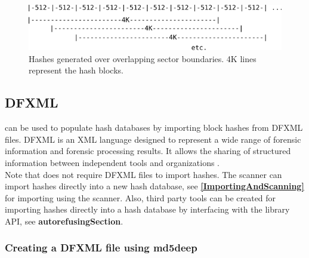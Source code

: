 \documentclass[11pt,fleqn]{article} %
\begin{document}
\begin{figure}
	\center
	\includegraphics[scale=1.1]{drawings/sector_boundaries}
	\caption{Hashes generated over overlapping sector boundaries. 4K lines represent the hash blocks.}
	\label{fig:sectorboundaries}
\end{figure}



\subsection{DFXML}
\label{createDFXML}
\hash can be used to populate hash databases by importing block hashes from DFXML files.
DFXML is an XML language designed to represent a wide range of forensic information and forensic processing results. It allows the sharing of structured information between independent tools and organizations \cite{dfxmlpaper}.\\

Note that \hash does not require DFXML files to import hashes.
The \bulk \hash scanner can import hashes directly into a new hash database,
see \textbf{\autoref{ImportingAndScanning}} for importing using the \bulk \hash scanner.
Also, third party tools can be created for importing hashes
directly into a hash database by interfacing with the \hash library API,
see \textbf{autoref{usingSection}}.

\subsubsection{Creating a DFXML file using \textbf{md5deep}}
\end{document}
